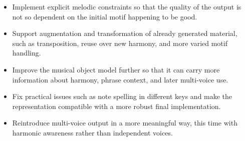   \begin{itemize}
    \item Implement explicit melodic constraints so that the quality of the output is not so dependent on the initial motif happening to be good.
    \item Support augmentation and transformation of already generated material, such as transposition, reuse over new harmony, and more varied motif handling.
    \item Improve the musical object model further so that it can carry more information about harmony, phrase context, and later multi-voice use.
    \item Fix practical issues such as note spelling in different keys and make the representation compatible with a more robust final implementation.
    \item Reintroduce multi-voice output in a more meaningful way, this time with harmonic awareness rather than independent voices.
  \end{itemize}
